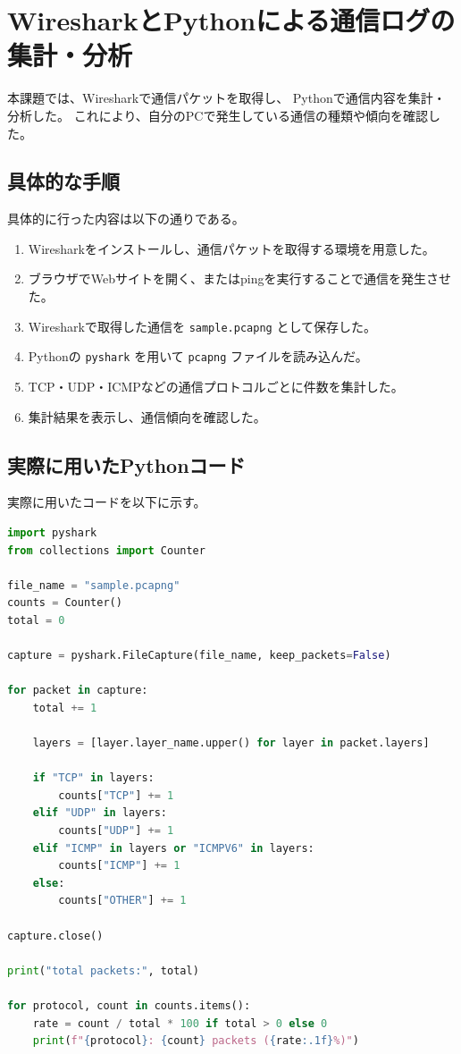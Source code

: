 \documentclass[a4paper,11pt,lualatex,ja=standard]{bxjsarticle}
\begin{document}
\section{WiresharkとPythonによる通信ログの集計・分析}

本課題では、Wiresharkで通信パケットを取得し、
Pythonで通信内容を集計・分析した。
これにより、自分のPCで発生している通信の種類や傾向を確認した。

\subsection{具体的な手順}

具体的に行った内容は以下の通りである。

\begin{enumerate}
  \item Wiresharkをインストールし、通信パケットを取得する環境を用意した。
  \item ブラウザでWebサイトを開く、またはpingを実行することで通信を発生させた。
  \item Wiresharkで取得した通信を \texttt{sample.pcapng} として保存した。
  \item Pythonの \texttt{pyshark} を用いて \texttt{pcapng} ファイルを読み込んだ。
  \item TCP・UDP・ICMPなどの通信プロトコルごとに件数を集計した。
  \item 集計結果を表示し、通信傾向を確認した。
\end{enumerate}

\subsection{実際に用いたPythonコード}

実際に用いたコードを以下に示す。

\begin{lstlisting}[language=Python]
import pyshark
from collections import Counter

file_name = "sample.pcapng"
counts = Counter()
total = 0

capture = pyshark.FileCapture(file_name, keep_packets=False)

for packet in capture:
    total += 1

    layers = [layer.layer_name.upper() for layer in packet.layers]

    if "TCP" in layers:
        counts["TCP"] += 1
    elif "UDP" in layers:
        counts["UDP"] += 1
    elif "ICMP" in layers or "ICMPV6" in layers:
        counts["ICMP"] += 1
    else:
        counts["OTHER"] += 1

capture.close()

print("total packets:", total)

for protocol, count in counts.items():
    rate = count / total * 100 if total > 0 else 0
    print(f"{protocol}: {count} packets ({rate:.1f}%)")
\end{lstlisting}
\end{document}
